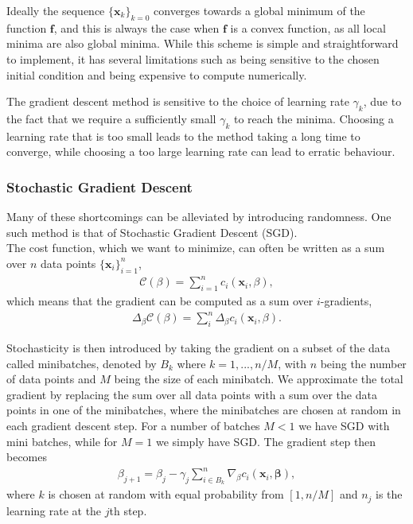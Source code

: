 \documentclass[english,notitlepage,reprint,nofootinbib]{revtex4–2}  %
\begin{document}
Ideally the sequence $\{\boldsymbol{x}_k\}_{k=0}$ converges towards a global minimum of the function $\boldsymbol{f}$, and this is always the case when $\boldsymbol{f}$ is a convex function, as all local minima are also global minima. While this scheme is simple and straightforward to implement, it has several limitations such as being sensitive to the chosen initial condition and being expensive to compute numerically.

The gradient descent method is sensitive to the choice of learning rate $\gamma_k$, due to the fact that we require a sufficiently small $\gamma_k$ to reach the minima. Choosing a learning rate that is too small leads to the method taking a long time to converge, while choosing a too large learning rate can lead to erratic behaviour. 

\subsubsection{Stochastic Gradient Descent}%
Many of these shortcomings can be alleviated by introducing randomness. One such method is that of Stochastic Gradient Descent (SGD). 
\vspace{3mm}
\\ 
The cost function, which we want to minimize, can often be written as a sum over $n$ data points $\{\boldsymbol{x}_i\}^n_{i=1}$, 
\begin{align}
    \mathcal{C}(\beta) = \sum\limits_{i=1}^n c_i (\boldsymbol{x}_i, \beta), \nonumber 
\end{align}
which means that the gradient can be computed as a sum over $i$-gradients, 
\begin{align}\label{eq: costfunc_SGD}
    \Delta_\beta \mathcal{C}(\beta) = \sum\limits_{i}^n \Delta_\beta c_i  (\boldsymbol{x}_i, \beta). 
\end{align}

Stochasticity is then introduced by taking the gradient on a subset of the data called minibatches, denoted by $B_k$ where $k=1, ..., n/M$, with $n$ being the number of data points and $M$ being the size of each minibatch. We approximate the total gradient by replacing the sum over all data points with a sum over the data points in one of the minibatches, 
where the minibatches are chosen at random in each gradient descent step. For a number of batches $M<1$ we have SGD with mini batches, while for $M=1$ we simply have SGD. 
The gradient step then becomes 
\begin{align}
    \beta_{j+1} 
    = \beta_j - \gamma_j \sum_{i \in B_k}^n \nabla_\beta c_i(\mathbf{x}_i,
    \mathbf{\beta}),  \nonumber
\end{align}
where $k$ is chosen at random with equal probability from $[1, n/M]$ and $n_j$ is the learning rate at the $j$th step. 
\end{document}
